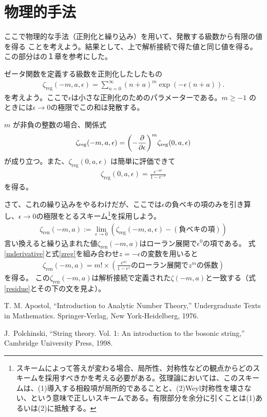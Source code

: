 \documentclass[12pt,a4paper,dvipdfmx]{jlreq}
\newcommand{\zreg}{\zeta_{\mathrm{reg}}}
\newcommand{\zren}{\zeta_{\mathrm{ren}}}
\begin{document}
\section{物理的手法}

ここで物理的な手法（正則化と繰り込み）を用いて、発散する級数から有限の値を得る
ことを考えよう。結果として、上で解析接続で得た値と同じ値を得る。
この部分は\cite{Polchinski:1998rq}の１章を参考にした。

ゼータ関数を定義する級数を正則化したしたもの
\begin{align}
  \zreg(-m,a,\epsilon)=\sum_{n=0}^{\infty}(n+a)^m\exp(-\epsilon(n+a)).
\end{align}
を考えよう。ここで$\epsilon$は小さな正則化のためのパラメーターである。$m \ge -1$ のときには$\epsilon\to 0$の極限でこの和は発散する。

$m$ が非負の整数の場合、関係式
\begin{align}
  \zreg(-m,a,\epsilon)=\qty(-\pdv{\epsilon})^{m}\zreg(0,a,\epsilon)\label{mderivative}
\end{align}
が成り立つ。また、$\zreg(0,a,\epsilon)$ は簡単に評価できて
\begin{align}
  \zreg(0,a,\epsilon)=\frac{e^{-a\epsilon}}{1-e^{-\epsilon}}\label{zreg}
\end{align}
を得る。

さて、これの繰り込みをやるわけだが、ここでは$\epsilon$の負ベキの項のみを引き算し、$\epsilon\to0$の極限をとるスキーム\footnote{スキームによって答えが変わる場合、局所性、対称性などの観点からどのスキームを採用すべきかを考える必要がある。弦理論においては、このスキームは、(1)導入する相殺項が局所的であることと、(2)Weyl対称性を壊さない、という意味で正しいスキームである。有限部分を余分に引くことは(1)あるいは(2)に抵触する。}を採用しよう。
\begin{align}
  \zren(-m,a):=\lim_{\epsilon\to 0} (\zreg(-m,a,\epsilon)-(\text{負ベキの項}))
\end{align}
言い換えると繰り込まれた値$\zren(-m,a)$はローラン展開で$\epsilon^0$の項である。
式\eqref{mderivative}と式\eqref{zreg}を組み合わせ$z=-\epsilon$の変数を用いると
\begin{align}
  \zren(-m,a)=m!\times (\frac{e^{az}}{1-e^{z}}\text{のローラン展開で} z^m \text{の係数} )
\end{align}
を得る。
この$\zren(-m,a)$は解析接続で定義された$\zeta(-m,a)$と一致する（式\eqref{residue}とその下の文を見よ）。
\begin{thebibliography}{9}
  T. M. Apostol, ``Introduction to Analytic Number Theory,''
  Undergraduate Texts in Mathematics. Springer-Verlag, New York-Heidelberg, 1976.

J.~Polchinski,
``String theory. Vol. 1: An introduction to the bosonic string,'' Cambridge University Press, 1998.

\end{thebibliography}
\end{document}
